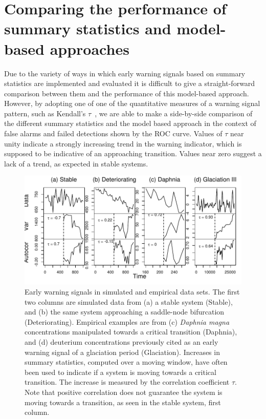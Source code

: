 \documentclass[authoryear,review,11pt]{elsarticle}
\begin{document}
\section{Comparing the performance of summary statistics and model-based approaches}  
Due to the variety of ways in which early warning signals based on summary statistics are implemented and evaluated
it is difficult to give a straight-forward comparison between them and the performance of this model-based approach.
However, by adopting one of one of the quantitative measures of a warning signal pattern,
such as Kendall's $\tau$~\citep{Dakos2008, Dakos2011, Dakos2009}, 
we are able to make a side-by-side comparison of the different summary statistics and the model based approach in the
context of false alarms and failed detections shown by the ROC curve.  
Values of $\tau$ near unity indicate a strongly increasing trend in the warning indicator, 
which is supposed to be indicative of an approaching transition.  
Values near zero suggest a lack of a trend, as expected in stable systems.

\begin{figure}
   \begin{center}
     \includegraphics[width=\linewidth]{figures/Fig2.pdf}
     \caption{Early warning signals in simulated and empirical data sets.  The first two columns are simulated data from (a) a stable system (Stable), and (b) the same system approaching a saddle-node bifurcation (Deteriorating).  Empirical examples are from (c) \emph{Daphnia magna} concentrations manipulated towards a critical transition (Daphnia), and (d) deuterium concentrations previously cited as an early warning signal of a glaciation period (Glaciation). Increases in summary statistics, computed over a moving window, have often been used to indicate if a system is moving towards a critical transition.  The increase is measured by the correlation coefficient $\tau$.  Note that positive correlation does not guarantee the system is moving towards a transition, as seen in the stable system, first column.}
     \label{fig:summary_stats}
  \end{center}
 \end{figure}
\end{document}
